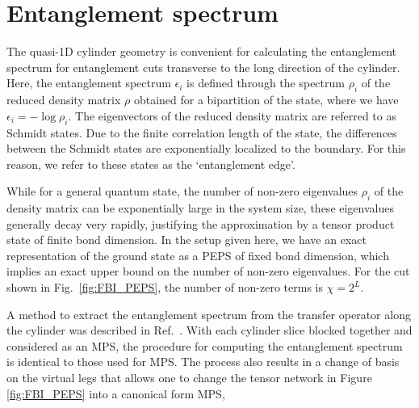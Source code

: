 
\newcommand{\uL}{\mathbf{L_0}}
\newcommand{\bL}{\mathbf{\bar{L}_0}}

\section{Entanglement spectrum}
\label{sec:ES}


The quasi-1D cylinder geometry is convenient for calculating the
entanglement spectrum for entanglement cuts transverse to the long direction of the
cylinder. Here, the entanglement spectrum $\epsilon_i$ is defined through the spectrum
$\rho_i$ of the reduced density matrix $\rho$ obtained for a bipartition of the state,
where we have $\epsilon_i = -\log \rho_i$.
The eigenvectors of the reduced density matrix are referred to as Schmidt
states.
Due to the finite correlation length of the state, the
differences between the Schmidt states are exponentially localized to the
boundary. For this reason, we refer to these states as the `entanglement
edge'.

While for a general quantum state, the number of non-zero eigenvalues $\rho_i$ of the
density matrix can be exponentially large in the system size, these eigenvalues generally
decay very rapidly, justifying the approximation by a tensor product state of finite bond
dimension.
In the setup given here, we have an exact representation of the ground state as a PEPS of
fixed bond dimension, which implies an exact upper bound on the number of non-zero eigenvalues.
For the cut shown in Fig.~\ref{fig:FBI_PEPS}, the number of non-zero terms is $\chi=2^L$.

A method to extract the entanglement spectrum from the transfer
operator along the cylinder was described in Ref.~.
With each cylinder slice blocked together and considered as an MPS, the procedure for
computing the entanglement spectrum is identical to those used for MPS. The process also
results in a change of basis on the virtual legs that allows one to change the tensor
network in Figure \ref{fig:FBI_PEPS} into a canonical form MPS,

